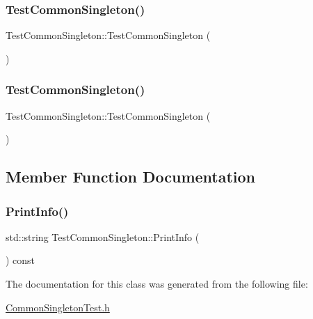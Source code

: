 \subsubsection{\texorpdfstring{TestCommonSingleton()}{TestCommonSingleton()}\hspace{0.1cm}{\footnotesize\ttfamily [1/2]}}
{\footnotesize\ttfamily Test\+Common\+Singleton\+::\+Test\+Common\+Singleton (\begin{DoxyParamCaption}\item[{Helper\+Token}]{ }\end{DoxyParamCaption})\hspace{0.3cm}{\ttfamily [inline]}}

\mbox{\label{class_test_common_singleton_ab54124ee482b7b31641fa1058e44b694}} 
\subsubsection{\texorpdfstring{TestCommonSingleton()}{TestCommonSingleton()}\hspace{0.1cm}{\footnotesize\ttfamily [2/2]}}
{\footnotesize\ttfamily Test\+Common\+Singleton\+::\+Test\+Common\+Singleton (\begin{DoxyParamCaption}{ }\end{DoxyParamCaption})\hspace{0.3cm}{\ttfamily [inline]}}



\subsection{Member Function Documentation}
\mbox{\label{class_test_common_singleton_a73ae91b8a0a23ae80e43c5effe13448c}} 
\subsubsection{\texorpdfstring{PrintInfo()}{PrintInfo()}}
{\footnotesize\ttfamily std\+::string Test\+Common\+Singleton\+::\+Print\+Info (\begin{DoxyParamCaption}{ }\end{DoxyParamCaption}) const\hspace{0.3cm}{\ttfamily [inline]}}



The documentation for this class was generated from the following file\+:\begin{DoxyCompactItemize}
\item 
\mbox{\hyperlink{_common_singleton_test_8h}{Common\+Singleton\+Test.\+h}}\end{DoxyCompactItemize}
